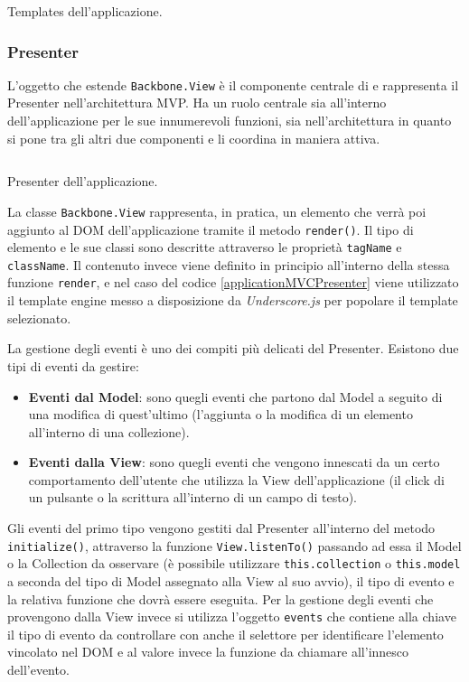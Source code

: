 \begin{listing}[ht]
\inputminted{xml}{sources/applicationMVCView.html}
\caption{Templates dell'applicazione.} 
\label{applicationMVCView} 
\end{listing} 

\subsubsection{Presenter}
L'oggetto che estende \texttt{Backbone.View} è il componente centrale di  e rappresenta il Presenter nell'architettura MVP. Ha un ruolo centrale sia all'interno dell'applicazione per le sue innumerevoli funzioni, sia nell'architettura in quanto si pone tra gli altri due componenti e li coordina in maniera attiva.

\begin{listing}[ht]
\inputminted{javascript}{sources/applicationMVCPresenter.js}
\caption{Presenter dell'applicazione.} 
\label{applicationMVCPresenter} 
\end{listing}

\noindent
La classe \texttt{Backbone.View} rappresenta, in pratica, un elemento che verrà poi aggiunto al DOM dell'applicazione tramite il metodo \texttt{render()}. Il tipo di elemento e le sue classi sono descritte attraverso le proprietà \texttt{tagName} e \texttt{className}.
Il contenuto invece viene definito in principio all'interno della stessa funzione \texttt{render}, e nel caso del codice \ref{applicationMVCPresenter} viene utilizzato il template engine messo a disposizione da \textit{Underscore.js} per popolare il template selezionato.

La gestione degli eventi è uno dei compiti più delicati del Presenter. Esistono due tipi di eventi da gestire:

\begin{itemize}
    \item \textbf{Eventi dal Model}: sono quegli eventi che partono dal Model a seguito di una modifica di quest'ultimo (l'aggiunta o la modifica di un elemento all'interno di una collezione).
    \item \textbf{Eventi dalla View}: sono quegli eventi che vengono innescati da un certo comportamento dell'utente che utilizza la View dell'applicazione (il click di un pulsante o la scrittura all'interno di un campo di testo).
\end{itemize}

\noindent
Gli eventi del primo tipo vengono gestiti dal Presenter all'interno del metodo \texttt{initialize()}, attraverso la funzione \texttt{View.listenTo()} passando ad essa il Model o la Collection da osservare (è possibile utilizzare \texttt{this.collection} o \texttt{this.model} a seconda del tipo di Model assegnato alla View al suo avvio), il tipo di evento e la relativa funzione che dovrà essere eseguita.
Per la gestione degli eventi che provengono dalla View invece si utilizza l'oggetto \texttt{events} che contiene alla chiave il tipo di evento da controllare con anche il selettore per identificare l'elemento vincolato nel DOM e al valore invece la funzione da chiamare all'innesco dell'evento.

